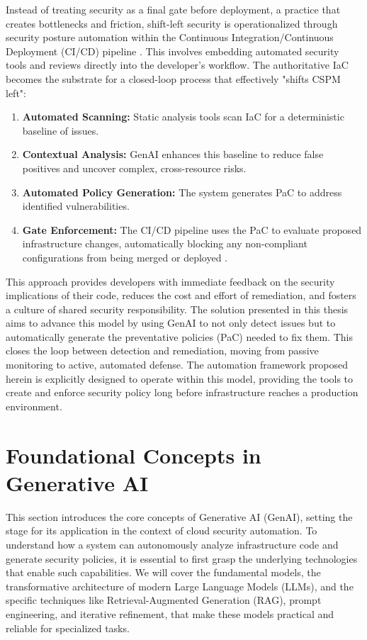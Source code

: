 Instead of treating security as a final gate before deployment, a practice that creates bottlenecks and friction, shift-left security is operationalized through security posture automation within the Continuous Integration/Continuous Deployment (CI/CD) pipeline \cite{fu_ai_2025}. This involves embedding automated security tools and reviews directly into the developer's workflow. The authoritative IaC becomes the substrate for a closed-loop process that effectively "shifts CSPM left":
\begin{enumerate}
    \item \textbf{Automated Scanning:} Static analysis tools scan IaC for a deterministic baseline of issues.
    \item \textbf{Contextual Analysis:} GenAI enhances this baseline to reduce false positives and uncover complex, cross-resource risks.
    \item \textbf{Automated Policy Generation:} The system generates PaC to address identified vulnerabilities.
    \item \textbf{Gate Enforcement:} The CI/CD pipeline uses the PaC to evaluate proposed infrastructure changes, automatically blocking any non-compliant configurations from being merged or deployed \cite{gunathilaka_context-aware_2025-1}.
\end{enumerate}
This approach provides developers with immediate feedback on the security implications of their code, reduces the cost and effort of remediation, and fosters a culture of shared security responsibility. The solution presented in this thesis aims to advance this model by using GenAI to not only detect issues but to automatically generate the preventative policies (PaC) needed to fix them. This closes the loop between detection and remediation, moving from passive monitoring to active, automated defense. The automation framework proposed herein is explicitly designed to operate within this model, providing the tools to create and enforce security policy long before infrastructure reaches a production environment.


\section{Foundational Concepts in Generative AI}
\label{sec:foundational_genai}

This section introduces the core concepts of Generative AI (GenAI), setting the stage for its application in the context of cloud security automation. To understand how a system can autonomously analyze infrastructure code and generate security policies, it is essential to first grasp the underlying technologies that enable such capabilities. We will cover the fundamental models, the transformative architecture of modern Large Language Models (LLMs), and the specific techniques like Retrieval-Augmented Generation (RAG), prompt engineering, and iterative refinement, that make these models practical and reliable for specialized tasks.

